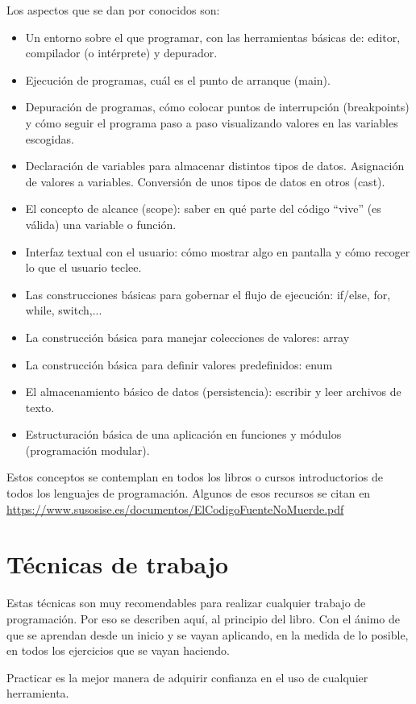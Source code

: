 \documentclass[spanish,12pt,a4paper,final,oneside]{book}
\begin{document}
Los aspectos que se dan por conocidos son:
\begin{itemize}
\item Un entorno sobre el que programar, con las herramientas básicas de: editor, compilador (o intérprete) y depurador.
\item Ejecución de programas, cuál es el punto de arranque (main).
\item Depuración de programas, cómo colocar puntos de interrupción (breakpoints) y cómo seguir el programa paso a paso visualizando valores en las variables escogidas.
\item Declaración de variables para almacenar distintos tipos de datos. Asignación de valores a variables. Conversión de unos tipos de datos en otros (cast).
\item El concepto de alcance (scope): saber en qué parte del código “vive” (es válida) una variable o función.
\item Interfaz textual con el usuario: cómo mostrar algo en pantalla y cómo recoger lo que el usuario teclee. 
\item Las construcciones básicas para gobernar el flujo de ejecución: if/else, for, while, switch,...
\item La construcción básica para manejar colecciones de valores: array
\item La construcción básica para definir valores predefinidos: enum
\item El almacenamiento básico de datos (persistencia): escribir y leer archivos de texto.
\item Estructuración básica de una aplicación en funciones y módulos (programación modular).
\end{itemize}

Estos conceptos se contemplan en todos los libros o cursos introductorios de todos los lenguajes de programación. Algunos de esos recursos se citan en  \url{https://www.susosise.es/documentos/ElCodigoFuenteNoMuerde.pdf}

\chapter{Técnicas de trabajo}
Estas técnicas son muy recomendables para realizar cualquier trabajo de programación. Por eso se describen aquí, al principio del libro. Con el ánimo de que se aprendan desde un inicio y se vayan aplicando, en la medida de lo posible, en todos los ejercicios que se vayan haciendo.

Practicar es la mejor manera de adquirir confianza en el uso de cualquier herramienta.
\end{document}
